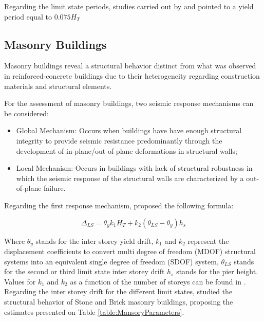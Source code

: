Regarding the limit state periods, studies carried out by  \citet{Vuranetal2008} and \citet{Baletal2010} pointed to a yield period equal to $0.075H_T$

\subsection{Masonry Buildings}
Masonry buildings reveal a structural behavior distinct from what was observed in reinforced-concrete buildings due to their heterogeneity regarding construction materials and structural elements. 

For the assessment of masonry buildings, two seismic response mechanisms can be considered: 
\begin{itemize}
\item Global Mechanism: Occurs when buildings have have enough structural integrity to provide seismic resistance predominantly through the development of in-plane/out-of-plane deformations in structural walls;
\item Local Mechanism: Occurs in buildings with lack of structural robustness in which the seismic response of the structural walls are characterized by a out-of-plane failure.
\end{itemize}

Regarding the first response mechanism, \citet{RestrepoMagenes2004} proposed the following formula:

\begin{equation}
\Delta_{LS}=\theta_yk_1H_T+k_2(\theta_{LS}-\theta_y)h_s
\end{equation}

Where $\theta_y$ stands for the inter storey yield drift, $k_1$ and $k_2$ represent the displacement coefficients to convert multi degree of freedom (MDOF) structural systems into an equivalent single degree of freedom (SDOF) system, $\theta_{LS}$ stands for the second or third limit state inter storey drift $h_s$ stands for the pier height. Values for $k_1$ and $k_2$ as a function of the number of storeys can be found in \citep{RestrepoMagenes2004}. Regarding the inter storey drift for the different limit states, \citep{Ahmadetal2011} studied the structural behavior of Stone and Brick masonry buildings, proposing the estimates presented on Table \ref{table:MansoryParameters}.

